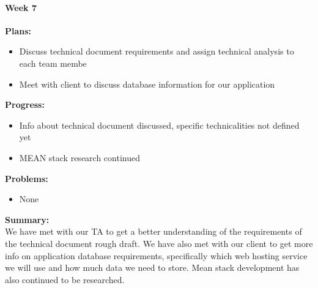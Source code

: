 \paragraph{Week 7}
\begin{adjustwidth}{2.5em}{0pt}
    \vspace{-0.5cm}\textbf{Plans:}
    \vspace{-0.5cm}
    \begin{itemize}
        \item Discuss technical document requirements and assign technical analysis to each team membe
        \item Meet with client to discuss database information for our application

    \end{itemize} 
    \vspace{-0.3cm}\textbf{Progress:}
    \vspace{-0.5cm}
    \begin{itemize}
        \item Info about technical document discussed, specific technicalities not defined yet
        \item MEAN stack research continued
    \end{itemize} 
    \vspace{-0.3cm}\textbf{Problems:}
    \vspace{-0.5cm}
    \begin{itemize}
        \item None
    \end{itemize}  
    \vspace{-0.3cm}\noindent\textbf{Summary:}\\
    \noindent We have met with our TA to get a better understanding of the requirements of the technical document rough draft. We have also met with our client to get more info on application database requirements, specifically which web hosting service we will use and how much data we need to store. Mean stack development has also continued to be researched. 
	\end{adjustwidth} 
